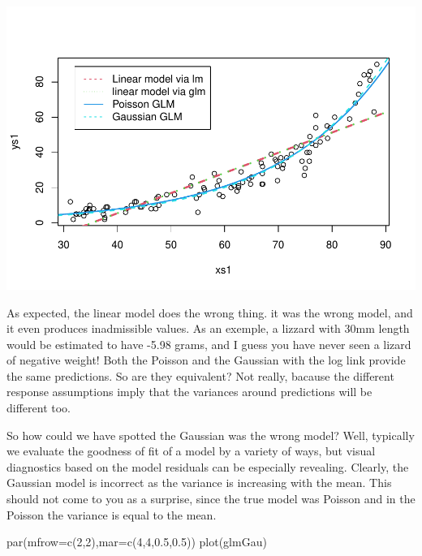 \documentclass[
]{book}
\newenvironment{Shaded}{\begin{snugshade}}{\end{snugshade}}
\newcommand{\AttributeTok}[1]{\textcolor[rgb]{0.77,0.63,0.00}{#1}}
\newcommand{\DecValTok}[1]{\textcolor[rgb]{0.00,0.00,0.81}{#1}}
\newcommand{\FloatTok}[1]{\textcolor[rgb]{0.00,0.00,0.81}{#1}}
\newcommand{\FunctionTok}[1]{\textcolor[rgb]{0.00,0.00,0.00}{#1}}
\newcommand{\NormalTok}[1]{#1}
\begin{document}
\begin{Shaded}
\begin{Highlighting}[]
\end{Highlighting}
\end{Shaded}

\includegraphics{ECOMODbook_files/figure-latex/glm4-1.pdf}

As expected, the linear model does the wrong thing. it was the wrong model, and it even produces inadmissible values. As an exemple, a lizzard with 30mm length would be estimated to have -5.98 grams, and I guess you have never seen a lizard of negative weight! Both the Poisson and the Gaussian with the log link provide the same predictions. So are they equivalent? Not really, bacause the different response assumptions imply that the variances around predictions will be different too.

So how could we have spotted the Gaussian was the wrong model? Well, typically we evaluate the goodness of fit of a model by a variety of ways, but visual diagnostics based on the model residuals can be especially revealing. Clearly, the Gaussian model is incorrect as the variance is increasing with the mean. This should not come to you as a surprise, since the true model was Poisson and in the Poisson the variance is equal to the mean.

\begin{Shaded}
\begin{Highlighting}[]
\FunctionTok{par}\NormalTok{(}\AttributeTok{mfrow=}\FunctionTok{c}\NormalTok{(}\DecValTok{2}\NormalTok{,}\DecValTok{2}\NormalTok{),}\AttributeTok{mar=}\FunctionTok{c}\NormalTok{(}\DecValTok{4}\NormalTok{,}\DecValTok{4}\NormalTok{,}\FloatTok{0.5}\NormalTok{,}\FloatTok{0.5}\NormalTok{))}
\FunctionTok{plot}\NormalTok{(glmGau)}
\end{Highlighting}
\end{Shaded}
\end{document}
